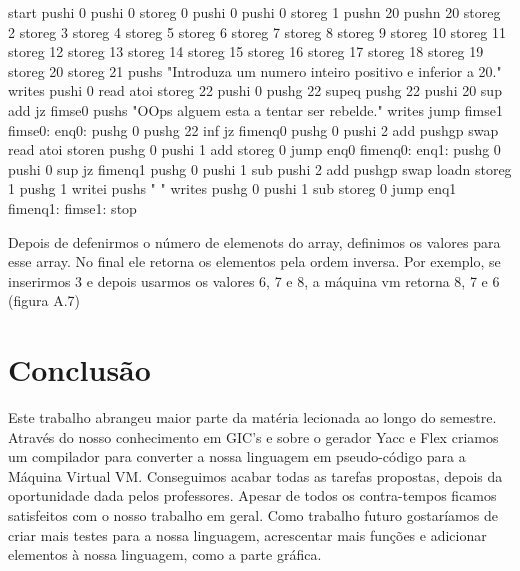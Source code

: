 \documentclass{report}
\begin{document}
\begin{enumerate}
 	\begin{code}
 		start
 		pushi 0
 		pushi 0
 		storeg 0
 		pushi 0
 		pushi 0
 		storeg 1
 		pushn 20
 		pushn 20
 		storeg 2
 		storeg 3
 		storeg 4
 		storeg 5
 		storeg 6
 		storeg 7
 		storeg 8
 		storeg 9
 		storeg 10
 		storeg 11
 		storeg 12
 		storeg 13
 		storeg 14
 		storeg 15
 		storeg 16
 		storeg 17
 		storeg 18
 		storeg 19
 		storeg 20
 		storeg 21
 		pushs "Introduza um numero inteiro positivo e inferior a 20.\n"
 		writes
 		pushi 0
 		read
 		atoi
 		storeg 22
 		pushi 0
 		pushg 22
 		supeq
 		pushg 22
 		pushi 20
 		sup
 		add
 		jz fimse0
 		pushs "OOps alguem esta a tentar ser rebelde.\n"
 		writes
 		jump fimse1
 		fimse0:
 		enq0:
 		pushg 0
 		pushg 22
 		inf
 		jz fimenq0
 		pushg 0
 		pushi 2
 		add
 		pushgp
 		swap
 		read
 		atoi
 		storen
 		pushg 0
 		pushi 1
 		add
 		storeg 0
 		jump enq0
 		fimenq0:
 		enq1:
 		pushg 0
 		pushi 0
 		sup
 		jz fimenq1
 		pushg 0
 		pushi 1
 		sub
 		pushi 2
 		add
 		pushgp
 		swap
 		loadn
 		storeg 1
 		pushg 1
 		writei
 		pushs " \n"
 		writes
 		pushg 0
 		pushi 1
 		sub
 		storeg 0
 		jump enq1
 		fimenq1:
 		fimse1:
 		stop
 		
 	
	\end{code}
	\indent
	Depois de defenirmos o número de elemenots do array, definimos os valores para esse array. No final ele retorna os elementos pela ordem inversa. Por exemplo, se inserirmos 3 e depois usarmos os valores 6, 7 e 8, a máquina vm retorna 8, 7 e 6 (figura A.7)
	
	

\end{enumerate}
  





\chapter{Conclusão} \label{concl}
 \indent
 Este trabalho abrangeu maior parte da matéria lecionada ao longo do semestre. Através do nosso conhecimento em GIC's e sobre o gerador Yacc e Flex criamos um compilador para converter a nossa linguagem em pseudo-código para a Máquina Virtual VM. Conseguimos acabar todas as tarefas propostas, depois da oportunidade dada pelos professores. Apesar de todos os contra-tempos ficamos satisfeitos com o nosso trabalho em geral.
 \indent
 Como trabalho futuro gostaríamos de criar mais testes para a nossa linguagem, acrescentar mais funções e adicionar elementos à nossa linguagem, como a parte gráfica.  
\end{document}
